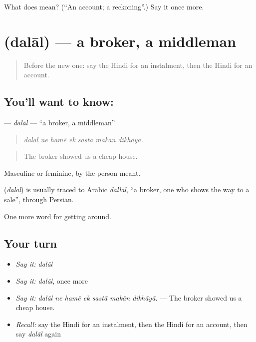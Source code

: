 \begin{tcolorbox}[breakable,colback=teal!4,colframe=teal!35!black,title={Before you move on}]
What does  mean? (\textquotedblleft{}An account; a reckoning\textquotedblright{}.) Say it once more.
\end{tcolorbox}
\section[\texorpdfstring{\hi{दलाल} (dalāl)}{दलाल (dalāl)}]{ (dalāl) — a broker, a middleman}

\label{lesson:HI-C427-dalal}



\begin{quote}
Before the new one: say the Hindi for an instalment, then the Hindi for an account.
\end{quote}

\subsection*{You'll want to know: }
\textbf{} — \emph{dalāl} — \textquotedblleft{}a broker, a middleman\textquotedblright{}.

\begin{quote}
      
\end{quote}

\begin{quote}
\emph{dalāl ne hamẽ ek sastā makān dikhāyā.}
\end{quote}

\begin{quote}
The broker showed us a cheap house.
\end{quote}

Masculine or feminine, by the person meant.

\begin{cousinweb}
\textbf{} (\emph{dalāl}) is usually traced to Arabic \emph{dallāl}, \textquotedblleft{}a broker, one who shows the way to a sale\textquotedblright{}, through Persian.
\end{cousinweb}

\begin{grammarlens}[title={What you've built}]
One more word for getting around.
\end{grammarlens}

\subsection*{Your turn}
\begin{itemize}
\raggedright
  \item \emph{Say it:} \emph{dalāl}
  \item \emph{Say it:} \emph{dalāl}, once more
  \item \emph{Say it:} \emph{dalāl ne hamẽ ek sastā makān dikhāyā.} — The broker showed us a cheap house.
  \item \emph{Recall:} say the Hindi for an instalment, then the Hindi for an account, then say \emph{dalāl} again
\end{itemize}

